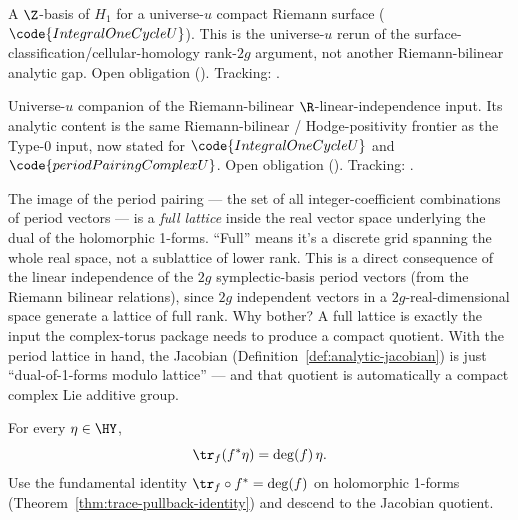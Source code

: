 \begin{lemma}
\label{lem:h1-basis-of-compact-riemann-surface-u}
A \(\Z\)-basis of \(H_1\) for a universe-\(u\) compact Riemann surface
(\(\code{IntegralOneCycleU}\)). This is the universe-\(u\) rerun of the
surface-classification/cellular-homology rank-\(2g\) argument, not another
Riemann-bilinear analytic gap. Open obligation ().
Tracking: .
\end{lemma}

\begin{lemma}
\label{lem:riemann-classical-real-li-input-u}
Universe-\(u\) companion of the Riemann-bilinear \(\R\)-linear-independence
input. Its analytic content is the same Riemann-bilinear / Hodge-positivity
frontier as the Type-0 input, now stated for \(\code{IntegralOneCycleU}\) and
\(\code{periodPairingComplexU}\). Open obligation ().
Tracking: .
\end{lemma}

\begin{layman}
The image of the period pairing --- the set of all integer-coefficient
combinations of period vectors --- is a \emph{full lattice} inside the
real vector space underlying the dual of the holomorphic 1-forms.
``Full'' means it's a discrete grid spanning the whole real space, not
a sublattice of lower rank. This is a direct consequence of the linear
independence of the \(2g\) symplectic-basis period vectors (from the
Riemann bilinear relations), since \(2g\) independent vectors in a
\(2g\)-real-dimensional space generate a lattice of full rank. Why
bother? A full lattice is exactly the input the complex-torus package
needs to produce a compact quotient. With the period lattice in
hand, the Jacobian (Definition~\ref{def:analytic-jacobian}) is just
``dual-of-1-forms modulo lattice'' --- and that quotient is
automatically a compact complex Lie additive group.
\end{layman}
\begin{theorem}
\label{thm:trace-pullback}
For every \(\eta\in\HY\),
\[
  \tr_f(f^{*}\eta)=\deg(f)\,\eta.
\]
\leanok
\proofplan
Use the fundamental identity \(\tr_f \circ f^* = \deg(f)\) on holomorphic 1-forms
(Theorem~\ref{thm:trace-pullback-identity}) and descend to the Jacobian quotient.
\end{theorem}

